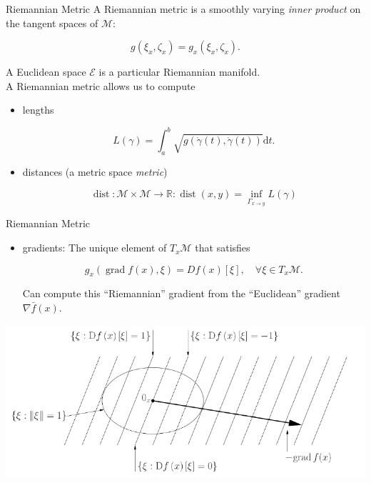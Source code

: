 \documentclass[xcolor=dvipsnames,t]{beamer} %
\newcommand{\reals}{\mathbb{R}}
\newcommand{\drm}{\mathrm{d}}
\begin{document}
\begin{frame}{Riemannian Metric}
   A Riemannian metric is a smoothly varying \emph{inner product} on the tangent spaces of $\mathcal{M}$:
   
   \[ g(\xi_x,\zeta_x) = g_x(\xi_x,\zeta_x). \] 

   A Euclidean space $\mathcal{E}$ is a particular Riemannian manifold.\\

   A Riemannian metric allows us to compute
   \begin{itemize}
      \item lengths

         \[ L(\gamma) = \int_a^b \sqrt{g(\dot{\gamma}(t),\dot{\gamma}(t))}\drm t. \] 

      \item distances (a metric space \emph{metric})
         
         \[ \operatorname{dist}:\mathcal{M}\times\mathcal{M}\to\reals:\operatorname{dist}(x,y)=\inf_{\Gamma_{x\to y}} L(\gamma) \] 
   \end{itemize}
\end{frame}

\begin{frame}{Riemannian Metric}
   \begin{itemize}
      \item gradients: The unique element of $T_x\mathcal{M}$ that satisfies

         \[ g_x(\operatorname{grad}f(x),\xi) = Df(x)[\xi], \quad \forall \xi\in T_x\mathcal{M}. \] 

         \noindent Can compute this ``Riemannian'' gradient from the ``Euclidean'' gradient $\nabla \bar{f}(x)$.

   \end{itemize}

   \begin{center}
      \includegraphics[width=\textwidth]{figures/gradient.pdf}
   \end{center}
\end{frame}
\end{document}

